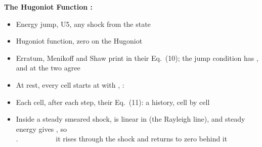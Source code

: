 \documentclass[11pt,addpoints]{exam}
\begin{document}
\begin{tcolorbox}[breakable]
\textbf{The Hugoniot Function \cite{menikoff2010}:}\vspace{.5em}
\begin{itemize}
\item Energy jump, \hspace{3mm}  \hspace{5mm} U5, any shock from the state \vspace{1.0em}
\item Hugoniot function, \hspace{3mm}  \hspace{5mm} zero on the Hugoniot\vspace{1.0em}
\item Erratum, \hspace{3mm} Menikoff and Shaw print  in their Eq.~(10); \hspace{2mm} the jump condition has , \hspace{2mm} and at  the two agree\vspace{1.0em}
\item At rest, \hspace{3mm} every cell starts at  with , : \hspace{5mm} \vspace{1.0em}
\item Each cell, after each step, \hspace{3mm}  \hspace{5mm} their Eq.~(11): a history, cell by cell\vspace{1.0em}
\item Inside a steady smeared shock, \hspace{3mm}  is linear in  (the Rayleigh line), and steady energy gives , so\vspace{.5em} \\
.~~~~~~~~~~ \hspace{5mm} it rises through the shock and returns to zero behind it\vspace{1.0em}

\end{itemize}
\end{tcolorbox}
\end{document}
